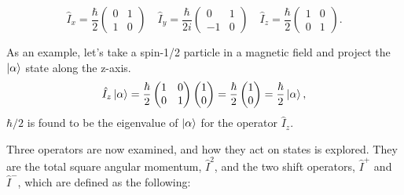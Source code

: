 \begin{equation}
  \hat{I}_x=\frac{\hbar}{2}\begin{pmatrix}
    0 & 1\\
    1 & 0
\end{pmatrix}\quad
\hat{I}_y=\frac{\hbar}{2i}\begin{pmatrix}
  0 & 1\\
  -1 & 0
\end{pmatrix}\quad
\hat{I}_z=\frac{\hbar}{2}\begin{pmatrix}
  1 & 0\\
  0 & 1
\end{pmatrix}.
\end{equation}

As an example, let's take a spin-1/2 particle in a magnetic field
and project the $\ket{\alpha}$ state along the z-axis.
\begin{equation}\label{eqn:operators}
  \hat{I}_z\ket{\alpha} = \frac{\hbar}{2}\begin{pmatrix}
    1 & 0\\
    0 & 1
\end{pmatrix}
\begin{pmatrix}
  1\\
  0
\end{pmatrix} = \frac{\hbar}{2}\begin{pmatrix}
  1\\
  0
\end{pmatrix} = \frac{\hbar}{2}\ket{\alpha},
\end{equation}
$\hbar/2$ is found to be the eigenvalue of $\ket{\alpha}$ for the operator $\hat{I}_z$.

Three operators are now examined, and how they act on states is explored. They are the total square angular momentum, $\hat{I}^2$,
and the two shift operators, $\hat{I}^+$ and $\hat{I}^-$, which are defined as the following:

